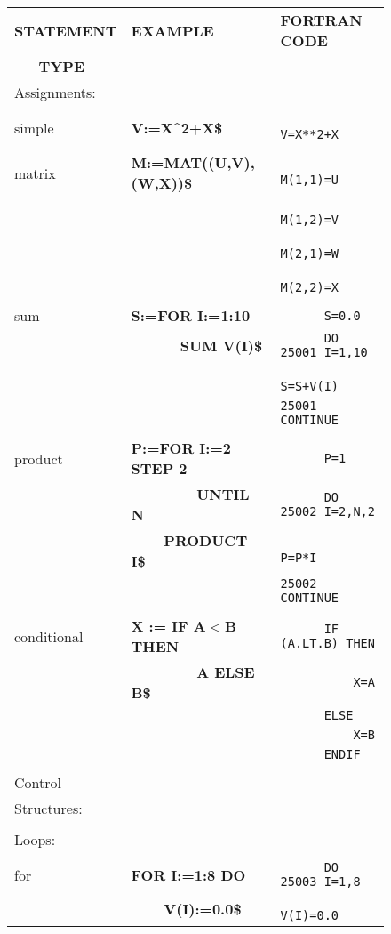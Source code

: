 \begin{figure}
\begin{center}
\begin{tabular}{||l|l|l||}\hline\hline
{\bf STATEMENT} & {\bf EXAMPLE} & {\bf FORTRAN CODE} \\
{\bf \ \ \  TYPE} & & \\ \hline\hline
Assignments: & &\\
& & \\
    simple     &{\bf V:=X\^{}2+X\$} &\verb!      V=X**2+X!\\
& & \\
    matrix     &{\bf M:=MAT((U,V),(W,X))\$} &\verb!      M(1,1)=U!\\
& &\verb!      M(1,2)=V!\\
& &\verb!      M(2,1)=W!\\
& &\verb!      M(2,2)=X!\\
& & \\
    sum &{\bf S:=FOR I:=1:10} &\verb!      S=0.0!\\
&{\bf\ \ \ \ \ \ SUM V(I)\$} &\verb!      DO 25001 I=1,10!\\
& &\verb!          S=S+V(I)!\\
& &\verb!25001 CONTINUE!\\
& & \\
    product    &{\bf P:=FOR I:=2 STEP 2} &\verb!      P=1!\\
&{\bf\ \ \ \ \ \ \ \ UNTIL N} &\verb!      DO 25002 I=2,N,2!\\
&{\bf \ \ \ \ PRODUCT I\$} &\verb!          P=P*I!\\
& &\verb!25002 CONTINUE!\\
& & \\
conditional & {\bf X := IF A$<$B THEN} &\verb!      IF (A.LT.B) THEN!\\
& {\bf \ \ \ \ \ \ \ \ A ELSE B\$} &\verb!          X=A!\\
& &\verb!      ELSE!\\
& &\verb!          X=B!\\
& &\verb!      ENDIF!\\
& & \\ \hline
Control & & \\
Structures: & &\\
& & \\
  Loops: & &\\
& &\\
    for &{\bf FOR I:=1:8 DO} &\verb!      DO 25003 I=1,8!\\
&{\bf \ \ \ \ V(I):=0.0\$} &\verb!          V(I)=0.0!\\

\end{tabular}
\end{center}
\end{figure}
